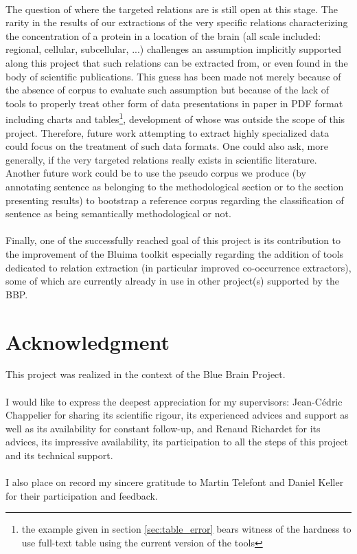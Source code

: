 \documentclass{report}
\begin{document}
				\paragraph{}The question of where the targeted relations are is still open at this stage.
				The rarity in the results of our extractions of the very specific relations characterizing the concentration of a protein in a location of the brain 
				(all scale included: regional, cellular, subcellular, ...) challenges an assumption implicitly supported
				along this project that such relations can be extracted from, or even found in the body of scientific publications. This guess
				has been made not merely because of the absence of corpus to evaluate such assumption but because of the lack of
				tools to properly treat other form of data presentations in paper in PDF format including charts and 
				tables\footnote{the example given in section \ref{sec:table_error} bears witness of the hardness to use full-text
				table using the current version of the tools}, development of whose
				was outside the scope of this project. Therefore, future work attempting to extract highly specialized data 
				could focus on the treatment of such data formats. One could also ask, more generally, if the very targeted relations really exists in scientific literature. Another future work could be to use the pseudo corpus we produce (by annotating sentence as belonging to the methodological section or to the section presenting results) to bootstrap a reference corpus regarding the classification of sentence as being semantically methodological or not. 					
				\paragraph{}Finally, one of the successfully reached goal of this project is its contribution to the improvement of the Bluima toolkit  \cite{bluima}
				especially regarding the addition of tools dedicated to relation extraction (in particular improved co-occurrence extractors),
				some of which are currently already in use in other project(s) supported by the BBP.	
				
			\section*{Acknowledgment}
			
			This project was realized in the context of the Blue Brain Project.
			
			\paragraph{}
			I would like to express the deepest appreciation for my supervisors: Jean-C\'edric Chappelier for sharing 
			its scientific rigour, its experienced advices and support as well as its availability for constant follow-up, 
			and Renaud Richardet for its advices, its impressive availability, its participation to all the steps of this 
			project and its technical support.
			\paragraph{}
			I also place on record my sincere gratitude to Martin Telefont and Daniel Keller for their participation
			and feedback.

			
		
\end{document}
